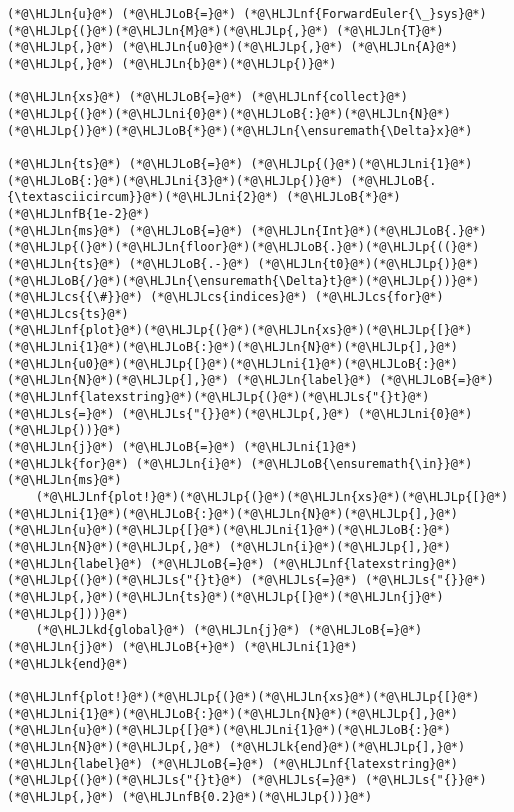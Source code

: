 \documentclass[12pt,a4paper]{article}
\newcommand{\HLJLk}[1]{\textcolor[RGB]{148,91,176}{\textbf{#1}}}
\newcommand{\HLJLkd}[1]{\textcolor[RGB]{214,102,97}{\textit{#1}}}
\newcommand{\HLJLn}[1]{#1}
\newcommand{\HLJLnf}[1]{\textcolor[RGB]{66,102,213}{#1}}
\newcommand{\HLJLs}[1]{\textcolor[RGB]{201,61,57}{#1}}
\newcommand{\HLJLnfB}[1]{\textcolor[RGB]{59,151,46}{#1}}
\newcommand{\HLJLni}[1]{\textcolor[RGB]{59,151,46}{#1}}
\newcommand{\HLJLoB}[1]{\textcolor[RGB]{102,102,102}{\textbf{#1}}}
\newcommand{\HLJLp}[1]{#1}
\newcommand{\HLJLcs}[1]{\textcolor[RGB]{153,153,119}{\textit{#1}}}
\begin{document}
\begin{lstlisting}
(*@\HLJLn{u}@*) (*@\HLJLoB{=}@*) (*@\HLJLnf{ForwardEuler{\_}sys}@*)(*@\HLJLp{(}@*)(*@\HLJLn{M}@*)(*@\HLJLp{,}@*) (*@\HLJLn{T}@*)(*@\HLJLp{,}@*) (*@\HLJLn{u0}@*)(*@\HLJLp{,}@*) (*@\HLJLn{A}@*)(*@\HLJLp{,}@*) (*@\HLJLn{b}@*)(*@\HLJLp{)}@*)

(*@\HLJLn{xs}@*) (*@\HLJLoB{=}@*) (*@\HLJLnf{collect}@*)(*@\HLJLp{(}@*)(*@\HLJLni{0}@*)(*@\HLJLoB{:}@*)(*@\HLJLn{N}@*)(*@\HLJLp{)}@*)(*@\HLJLoB{*}@*)(*@\HLJLn{\ensuremath{\Delta}x}@*)

(*@\HLJLn{ts}@*) (*@\HLJLoB{=}@*) (*@\HLJLp{(}@*)(*@\HLJLni{1}@*)(*@\HLJLoB{:}@*)(*@\HLJLni{3}@*)(*@\HLJLp{)}@*) (*@\HLJLoB{.{\textasciicircum}}@*)(*@\HLJLni{2}@*) (*@\HLJLoB{*}@*) (*@\HLJLnfB{1e-2}@*)
(*@\HLJLn{ms}@*) (*@\HLJLoB{=}@*) (*@\HLJLn{Int}@*)(*@\HLJLoB{.}@*)(*@\HLJLp{(}@*)(*@\HLJLn{floor}@*)(*@\HLJLoB{.}@*)(*@\HLJLp{((}@*)(*@\HLJLn{ts}@*) (*@\HLJLoB{.-}@*) (*@\HLJLn{t0}@*)(*@\HLJLp{)}@*)(*@\HLJLoB{/}@*)(*@\HLJLn{\ensuremath{\Delta}t}@*)(*@\HLJLp{))}@*)(*@\HLJLcs{{\#}}@*) (*@\HLJLcs{indices}@*) (*@\HLJLcs{for}@*) (*@\HLJLcs{ts}@*)
(*@\HLJLnf{plot}@*)(*@\HLJLp{(}@*)(*@\HLJLn{xs}@*)(*@\HLJLp{[}@*)(*@\HLJLni{1}@*)(*@\HLJLoB{:}@*)(*@\HLJLn{N}@*)(*@\HLJLp{],}@*) (*@\HLJLn{u0}@*)(*@\HLJLp{[}@*)(*@\HLJLni{1}@*)(*@\HLJLoB{:}@*)(*@\HLJLn{N}@*)(*@\HLJLp{],}@*) (*@\HLJLn{label}@*) (*@\HLJLoB{=}@*) (*@\HLJLnf{latexstring}@*)(*@\HLJLp{(}@*)(*@\HLJLs{"{}t}@*) (*@\HLJLs{=}@*) (*@\HLJLs{"{}}@*)(*@\HLJLp{,}@*) (*@\HLJLni{0}@*) (*@\HLJLp{))}@*)
(*@\HLJLn{j}@*) (*@\HLJLoB{=}@*) (*@\HLJLni{1}@*)
(*@\HLJLk{for}@*) (*@\HLJLn{i}@*) (*@\HLJLoB{\ensuremath{\in}}@*) (*@\HLJLn{ms}@*)
    (*@\HLJLnf{plot!}@*)(*@\HLJLp{(}@*)(*@\HLJLn{xs}@*)(*@\HLJLp{[}@*)(*@\HLJLni{1}@*)(*@\HLJLoB{:}@*)(*@\HLJLn{N}@*)(*@\HLJLp{],}@*) (*@\HLJLn{u}@*)(*@\HLJLp{[}@*)(*@\HLJLni{1}@*)(*@\HLJLoB{:}@*)(*@\HLJLn{N}@*)(*@\HLJLp{,}@*) (*@\HLJLn{i}@*)(*@\HLJLp{],}@*) (*@\HLJLn{label}@*) (*@\HLJLoB{=}@*) (*@\HLJLnf{latexstring}@*)(*@\HLJLp{(}@*)(*@\HLJLs{"{}t}@*) (*@\HLJLs{=}@*) (*@\HLJLs{"{}}@*)(*@\HLJLp{,}@*)(*@\HLJLn{ts}@*)(*@\HLJLp{[}@*)(*@\HLJLn{j}@*)(*@\HLJLp{]))}@*)
    (*@\HLJLkd{global}@*) (*@\HLJLn{j}@*) (*@\HLJLoB{=}@*) (*@\HLJLn{j}@*) (*@\HLJLoB{+}@*) (*@\HLJLni{1}@*)
(*@\HLJLk{end}@*)

(*@\HLJLnf{plot!}@*)(*@\HLJLp{(}@*)(*@\HLJLn{xs}@*)(*@\HLJLp{[}@*)(*@\HLJLni{1}@*)(*@\HLJLoB{:}@*)(*@\HLJLn{N}@*)(*@\HLJLp{],}@*) (*@\HLJLn{u}@*)(*@\HLJLp{[}@*)(*@\HLJLni{1}@*)(*@\HLJLoB{:}@*)(*@\HLJLn{N}@*)(*@\HLJLp{,}@*) (*@\HLJLk{end}@*)(*@\HLJLp{],}@*) (*@\HLJLn{label}@*) (*@\HLJLoB{=}@*) (*@\HLJLnf{latexstring}@*)(*@\HLJLp{(}@*)(*@\HLJLs{"{}t}@*) (*@\HLJLs{=}@*) (*@\HLJLs{"{}}@*)(*@\HLJLp{,}@*) (*@\HLJLnfB{0.2}@*)(*@\HLJLp{))}@*)
\end{lstlisting}
\end{document}
